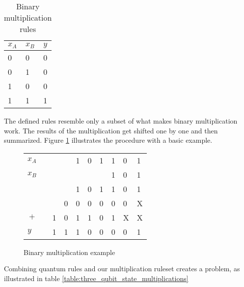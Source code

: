 \begin{table}[!h]
\centering
\begin{tabular}{|l|l|l|}
\hline
$x_A$ & $x_B$ & $y$ \\ \hline
0     & 0     & 0   \\ \hline
0     & 1     & 0   \\ \hline
1     & 0     & 0   \\ \hline
1     & 1     & 1   \\ \hline
\end{tabular}
\caption{Binary multiplication rules}
\label{table:binary_multiplication_rules}
\end{table}

The defined rules resemble only a subset of what makes binary multiplication work. The results of the multiplication get shifted one by one and then summarized. Figure \ref{figure:binary_multiplication_example} illustrates the procedure with a basic example.

\begin{figure}[!h]
\centering
\begin{tabular}{clllccllll}
$x_A$                   &  &   &   & 1                     & 0                     & 1 & 1 & 0 & 1 \\
$x_B$                   &  &   &   &                       &                       &   & 1 & 0 & 1 \\ \hline
                        &  &   &   & 1                     & 0                     & 1 & 1 & 0 & 1 \\
                        &  &   & 0 & 0                     & 0                     & 0 & 0 & 0 & X \\
$+$                     &  & 1 & 0 & 1                     & 1                     & 0 & 1 & X & X \\ \hline
\multicolumn{1}{l}{$y$} &  & 1 & 1 & \multicolumn{1}{l}{1} & \multicolumn{1}{l}{0} & 0 & 0 & 0 & 1
\end{tabular}
\caption{Binary multiplication example}
\label{figure:binary_multiplication_example}
\end{figure}

Combining quantum rules and our multiplication ruleset creates a problem, as illustrated in table \ref{table:three_qubit_state_multiplications}

